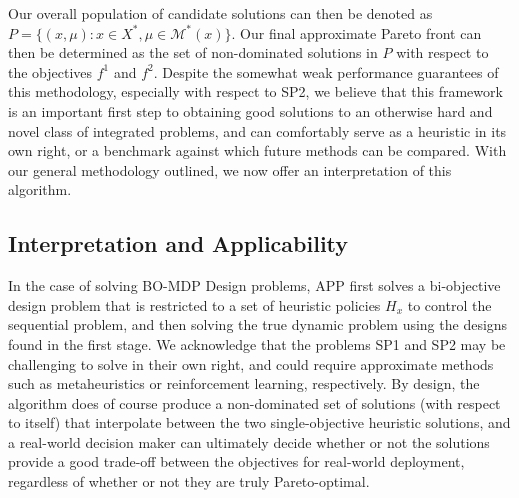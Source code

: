 \documentclass[11pt,authoryear,a4paper]{article}
\theoremstyle{definition}
\begin{document}
{Our overall population of candidate solutions can then be denoted as $P=\{(x,\mu):x\in X^*, \mu\in\mathcal{M}^*(x)\}$. Our final approximate Pareto front can then be determined as the set of non-dominated solutions in $P$ with respect to the objectives $f^1$ and $f^2$. {Despite the somewhat weak performance guarantees of this methodology, especially with respect to SP2, we believe that this framework is an important first step to obtaining good solutions to an otherwise hard and novel class of integrated problems, and can comfortably serve as a heuristic in its own right, or a benchmark against which future methods can be compared.} With our general methodology outlined, we now offer an interpretation of this algorithm.

\subsection{Interpretation and Applicability}
\label{paper1:methodology:InterpApplic}
In the case of solving BO-MDP Design problems, APP first solves a bi-objective design problem that is restricted to a set of heuristic policies $H_x$ to control the sequential problem, and then solving the true dynamic problem using the designs found in the first stage. We acknowledge that the problems SP1 and SP2 may be challenging to solve in their own right, and could require approximate methods such as metaheuristics or reinforcement learning, respectively. By design, the algorithm does of course produce a non-dominated set of solutions (with respect to itself) that interpolate between the two single-objective heuristic solutions, and a real-world decision maker can ultimately decide whether or not the solutions provide a good trade-off between the objectives for real-world deployment, regardless of whether or not they are truly Pareto-optimal.

}
\end{document}
